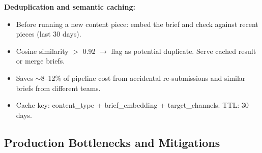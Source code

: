 \textbf{Deduplication and semantic caching:}

\begin{itemize}
  \item Before running a new content piece: embed the brief and check against recent pieces (last 30 days).
  \item Cosine similarity $>$ 0.92 $\rightarrow$ flag as potential duplicate. Serve cached result or merge briefs.
  \item Saves $\sim$8--12\% of pipeline cost from accidental re-submissions and similar briefs from different teams.
  \item Cache key: content\_type + brief\_embedding + target\_channels. TTL: 30 days.
\end{itemize}

\subsection*{Production Bottlenecks and Mitigations}

